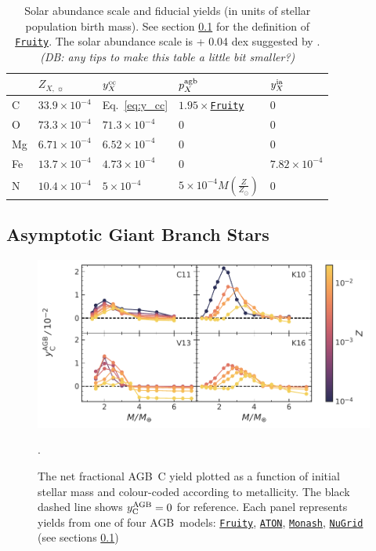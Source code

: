 \documentclass[fleqn,
usenatbib]{mnras}
\newcommand{\fruity}{\texttt{\hyperlink{fruity}{Fruity}}}
\newcommand{\nugrid}{\texttt{\hyperlink{nugrid}{NuGrid}}}
\newcommand{\monash}{\texttt{\hyperlink{monash}{Monash}}}
\newcommand{\aton}{\texttt{\hyperlink{aton}{ATON}}}
\newcommand{\cfactor}{1.95}
\newcommand{\agb}{AGB}
\newcommand{\Ycagb}{{y_{\rm C}^{\rm AGB}}}
\newcommand{\y}{p}
\newcommand{\dbnote}[1]{ {\color{Thistle} \textit{\small (DB: #1)}} }
\begin{document}
\begin{table}
	\centering
    \caption[]{Solar abundance scale and fiducial yields (in units of stellar population birth mass). See section \ref{sec:agb} for the definition of \fruity. The solar abundance scale is \citet{magg+22} + 0.04 dex suggested by \citet{david_fe}.
    \dbnote{any tips to make this table a little bit smaller?}
    }
	\label{tab:fiducial_mod}

	\begin{tabular}{l l l l l}
		\hline
         & $Z_{X,\,\sun}$ & $y_X^{\rm cc}$ & $\y_X^{\rm agb}$ & $y_X^{\rm ia}$  \\
		\hline
        C & $33.9\times10^{-4}$ & Eq.~\ref{eq:y_cc} & $\cfactor\times$\fruity &  0 \\
        O & $73.3\times10^{-4}$ & $71.3\times10^{-4}$ & 0 & 0 \\
        Mg & $6.71\times10^{-4}$ & $6.52\times 10^{-4}$ & 0 & 0 \\
        Fe & $13.7\times10^{-4}$ & $4.73\times10^{-4}$ & 0 & $7.82\times10^{-4}$ \\
        N & $10.4\times10^{-4}$ & $5\times10^{-4}$ & $5\times10^{-4}M\left(\frac{Z}{Z_\odot}\right)$ & 0\\
		\hline
	\end{tabular}
\end{table}


\subsection{Asymptotic Giant Branch Stars}\label{sec:agb}

\begin{figure}
    \centering
 	    \includegraphics[scale=1]{agb_yields.pdf}
        \caption[]{The net fractional \agb\ C yield  plotted as a function of initial stellar mass and colour-coded according to metallicity. The black dashed line shows $\Ycagb=0$ for reference. Each panel represents yields from one of four \agb\ models: \fruity{}, \aton{}, \monash{}, \nugrid{} (see sections \ref{sec:agb}) }.

        \label{fig:y_agb}
\end{figure}
\end{document}
